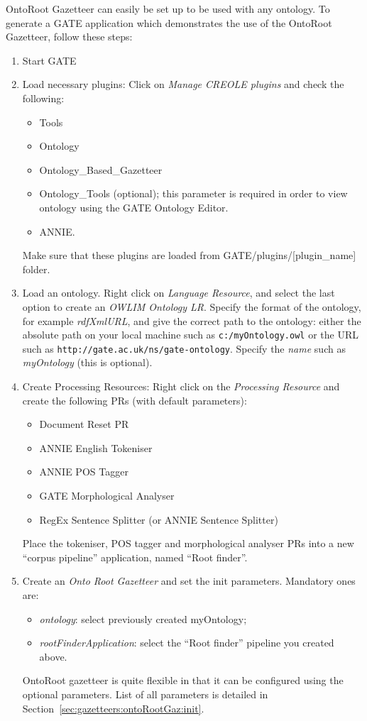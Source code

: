 OntoRoot Gazetteer can easily be set up to be used with any ontology. To
generate a GATE application which demonstrates the use of the OntoRoot
Gazetteer, follow these steps:
\begin{enumerate}
 \item Start GATE
 \item Load necessary plugins: Click on \emph{Manage CREOLE plugins} and check
the following:
      \begin{itemize}
       \item Tools
       \item Ontology
       \item Ontology\_Based\_Gazetteer
       \item Ontology\_Tools (optional); this parameter is required in order to
view ontology using the GATE Ontology Editor.
       \item ANNIE.
      \end{itemize}
Make sure that these plugins are loaded from GATE/plugins/[plugin\_name] folder.
  \item Load an ontology. Right click on \emph{Language Resource}, and select
the last option to create an \emph{OWLIM Ontology LR}. Specify the format 
of the ontology, for example \emph{rdfXmlURL}, and give the correct path to the 
ontology: either the absolute path on your local machine such as 
\texttt{c:/myOntology.owl} or the URL such as
\texttt{http://gate.ac.uk/ns/gate-ontology}.
Specify the \emph{name} such as \emph{myOntology} (this is
optional).
  \item Create Processing Resources: Right click on the \emph{Processing
Resource} and create the following PRs (with default parameters):
\begin{itemize}
 \item Document Reset PR
 \item ANNIE English Tokeniser
 \item ANNIE POS Tagger
 \item GATE Morphological Analyser
 \item RegEx Sentence Splitter (or ANNIE Sentence Splitter)
\end{itemize}

Place the tokeniser, POS tagger and morphological analyser PRs into a new
``corpus pipeline'' application, named ``Root finder''.

\item Create an \emph{Onto Root Gazetteer} and set the init parameters.
Mandatory ones are:
\begin{itemize}
 \item \emph{ontology}: select previously created myOntology;
 \item \emph{rootFinderApplication}: select the ``Root finder'' pipeline you
   created above.
\end{itemize}
OntoRoot gazetteer is quite flexible in that it can be configured using the
optional parameters. List of all parameters is detailed in
Section~\ref{sec:gazetteers:ontoRootGaz:init}.


\end{enumerate}
